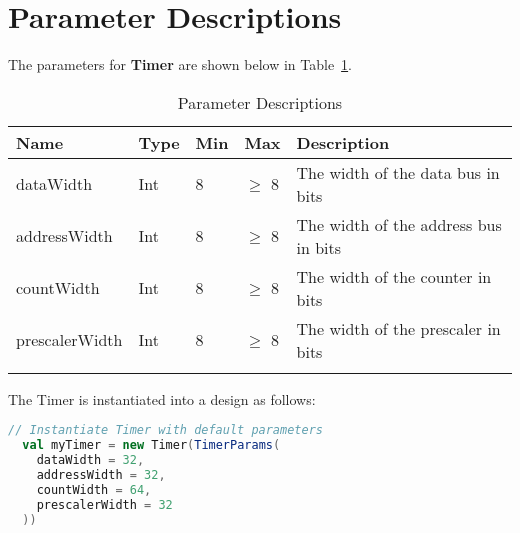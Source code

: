 \section{Parameter Descriptions}

The parameters for \textbf{Timer} are shown below in Table~\ref{table:params}.

\renewcommand*{\arraystretch}{1.4}
\begin{longtable}[H]{
    | p{}
    | p{}
    | p{}
    | p{}
    | p{} |
  }
  \hline
  \textbf{Name} &
  \textbf{Type} &
  \textbf{Min}  &
  \textbf{Max}  &
  \textbf{Description}            \\ \hline \hline

  dataWidth     &
  Int           &
  8             &
  $\ge$ 8       &
  The width of the data bus in bits      \\ \hline

  addressWidth  &
  Int           &
  8             &
  $\ge$ 8       &
  The width of the address bus in bits   \\ \hline

  countWidth    &
  Int           &
  8             &
  $\ge$ 8       &
  The width of the counter in bits       \\ \hline

  prescalerWidth    &
  Int           &
  8             &
  $\ge$ 8       &
  The width of the prescaler in bits       \\ \hline

  \caption{Parameter Descriptions}\label{table:params}
\end{longtable}

The Timer is instantiated into a design as follows:

\begin{lstlisting}[language=Scala]
  // Instantiate Timer with default parameters
  val myTimer = new Timer(TimerParams(
    dataWidth = 32,
    addressWidth = 32,
    countWidth = 64,
    prescalerWidth = 32
  ))
\end{lstlisting}